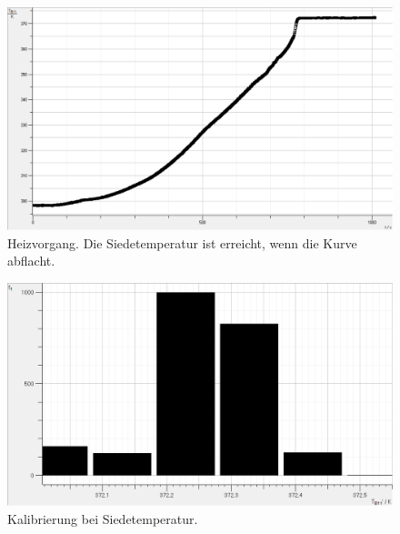 \documentclass[12pt,a4paper]{article}
\begin{document}
\begin{figure}[H]
\centering
\includegraphics[scale=0.5]{Bilder/heizen.png}
\caption{Heizvorgang. Die Siedetemperatur ist erreicht, wenn die Kurve abflacht.}
\end{figure}

\begin{figure}[H]
\centering
\includegraphics[scale=0.5]{Bilder/heizen_histogramm.png}
\caption{Kalibrierung bei Siedetemperatur.}
\end{figure}
\end{document}
